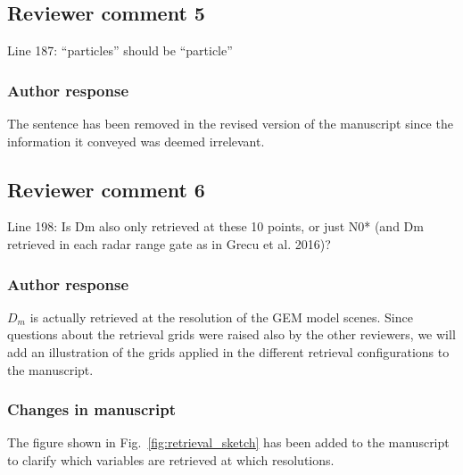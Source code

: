 
\subsection*{Reviewer comment 5}
Line 187: “particles” should be “particle”

\subsubsection*{Author response}

The sentence has been removed in the revised version of the manuscript since
the information it conveyed was deemed irrelevant.



\subsection*{Reviewer comment 6}
Line 198: Is Dm also only retrieved at these 10 points, or just N0* (and Dm retrieved in each radar range gate as in Grecu et al. 2016)?

\subsubsection*{Author response}

$D_m$ is actually retrieved at the resolution of the GEM model scenes. Since
questions about the retrieval grids were raised also by the other reviewers, we
will add an illustration of the grids applied in the different retrieval
configurations to the manuscript.

\subsubsection*{Changes in manuscript}
The figure shown in Fig.~\ref{fig:retrieval_sketch} has been added to the
manuscript to clarify which variables are retrieved at which resolutions.

